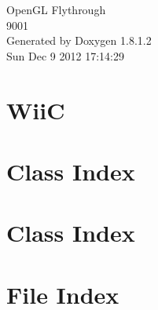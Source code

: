 \documentclass{book}
\begin{document}
\hypersetup{pageanchor=false,citecolor=blue}
\begin{titlepage}
\vspace*{7cm}
\begin{center}
{\Large Open\-G\-L Flythrough \\[1ex]\large 9001 }\\
\vspace*{1cm}
{\large Generated by Doxygen 1.8.1.2}\\
\vspace*{0.5cm}
{\small Sun Dec 9 2012 17:14:29}\\
\end{center}
\end{titlepage}
\clearemptydoublepage
{}
\tableofcontents
\clearemptydoublepage
{}
\hypersetup{pageanchor=true,citecolor=blue}
\chapter{Wii\-C}
\label{index}\hypertarget{index}{}
\chapter{Class Index}

\chapter{Class Index}

\chapter{File Index}

\end{document}
